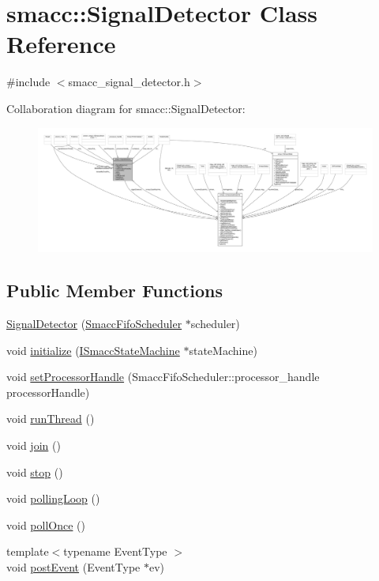 \hypertarget{classsmacc_1_1SignalDetector}{}\section{smacc\+:\+:Signal\+Detector Class Reference}
\label{classsmacc_1_1SignalDetector}


{\ttfamily \#include $<$smacc\+\_\+signal\+\_\+detector.\+h$>$}



Collaboration diagram for smacc\+:\+:Signal\+Detector\+:
\nopagebreak
\begin{figure}[H]
\begin{center}
\leavevmode
\includegraphics[width=350pt]{classsmacc_1_1SignalDetector__coll__graph}
\end{center}
\end{figure}
\subsection*{Public Member Functions}
\begin{DoxyCompactItemize}
\item 
\hyperlink{classsmacc_1_1SignalDetector_a24914014feb0ab01e2452af705ef2774}{Signal\+Detector} (\hyperlink{smacc__fifo__scheduler_8h_a0063e275231c80d5f97df21d17257bf7}{Smacc\+Fifo\+Scheduler} $\ast$scheduler)
\item 
void \hyperlink{classsmacc_1_1SignalDetector_a91ab3cd92d8095cdaf8610b50731f04b}{initialize} (\hyperlink{classsmacc_1_1ISmaccStateMachine}{I\+Smacc\+State\+Machine} $\ast$state\+Machine)
\item 
void \hyperlink{classsmacc_1_1SignalDetector_ac1197a77c32a3b817005391e550ce646}{set\+Processor\+Handle} (Smacc\+Fifo\+Scheduler\+::processor\+\_\+handle processor\+Handle)
\item 
void \hyperlink{classsmacc_1_1SignalDetector_a48b3fee853ddcb25732408b22ecfcf39}{run\+Thread} ()
\item 
void \hyperlink{classsmacc_1_1SignalDetector_a636f704e469bf74b4a9fdb15bd63d5be}{join} ()
\item 
void \hyperlink{classsmacc_1_1SignalDetector_a536ea005ea4ef4632c0c9c1c62c557a3}{stop} ()
\item 
void \hyperlink{classsmacc_1_1SignalDetector_a2665e66cdae9f6533c64bbcecf3fa199}{polling\+Loop} ()
\item 
void \hyperlink{classsmacc_1_1SignalDetector_a9a116479e23259f3a5d5d4a47278afd5}{poll\+Once} ()
\item 
{\footnotesize template$<$typename Event\+Type $>$ }\\void \hyperlink{classsmacc_1_1SignalDetector_a6ab99d99cef8d101e39797a72daeb2b7}{post\+Event} (Event\+Type $\ast$ev)
\end{DoxyCompactItemize}
